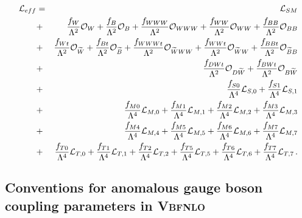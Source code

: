 \documentclass[english,12pt]{article}
\begin{document}
\vbox{
\begin{eqnarray}
 {\cal L}_{eff} &=& {\cal L}_{SM} \nonumber\\
        &+& \frac{f_{W}}{\Lambda^{2}} \mathcal{O}_{W} + \frac{f_{B}}{\Lambda^{2}} \mathcal{O}_{B}  
	+ \frac{f_{WWW}}{\Lambda^{2}} \mathcal{O}_{WWW} + \frac{f_{WW}}{\Lambda^{2}} \mathcal{O}_{WW} 
        + \frac{f_{BB}}{\Lambda^{2}} \mathcal{O}_{BB} \nonumber\\
        &+& \frac{f_{Wt}}{\Lambda^{2}} \mathcal{O}_{\widetilde{W}} + \frac{f_{Bt}}{\Lambda^{2}} \mathcal{O}_{\widetilde{B}} 
	+ \frac{f_{WWWt}}{\Lambda^{2}} \mathcal{O}_{\widetilde{W}WW} 
        + \frac{f_{WWt}}{\Lambda^{2}} \mathcal{O}_{\widetilde{W}W} + \frac{f_{BBt}}{\Lambda^{2}} \mathcal{O}_{\widetilde{B}B} \nonumber\\
        &+& \frac{f_{DWt}}{\Lambda^{2}} \mathcal{O}_{D\widetilde{W}} + \frac{f_{BWt}}{\Lambda^{2}} \mathcal{O}_{B\widetilde{W}} \nonumber\\
	&+& \frac{f_{S0}}{\Lambda^4} {\cal L}_{S,0} + \frac{f_{S1}}{\Lambda^4} {\cal L}_{S,1} \nonumber\\
	&+& \frac{f_{M0}}{\Lambda^4} {\cal L}_{M,0} + \frac{f_{M1}}{\Lambda^4} {\cal L}_{M,1}
	+ \frac{f_{M2}}{\Lambda^4} {\cal L}_{M,2} + \frac{f_{M3}}{\Lambda^4} {\cal L}_{M,3} \nonumber\\
	&+& \frac{f_{M4}}{\Lambda^4} {\cal L}_{M,4} + \frac{f_{M5}}{\Lambda^4} {\cal L}_{M,5}
	+ \frac{f_{M6}}{\Lambda^4} {\cal L}_{M,6} + \frac{f_{M7}}{\Lambda^4} {\cal L}_{M,7} \nonumber\\
	&+& \frac{f_{T0}}{\Lambda^4} {\cal L}_{T,0} + \frac{f_{T1}}{\Lambda^4} {\cal L}_{T,1}
	+ \frac{f_{T2}}{\Lambda^4} {\cal L}_{T,2} + \frac{f_{T5}}{\Lambda^4} {\cal L}_{T,5}
	+ \frac{f_{T6}}{\Lambda^4} {\cal L}_{T,6} + \frac{f_{T7}}{\Lambda^4} {\cal L}_{T,7} \, .
\label{leff}
\end{eqnarray}
}


\subsection{Conventions for anomalous gauge boson coupling parameters in \textsc{Vbfnlo}}
\label{ancpl_conversion}
\end{document}

